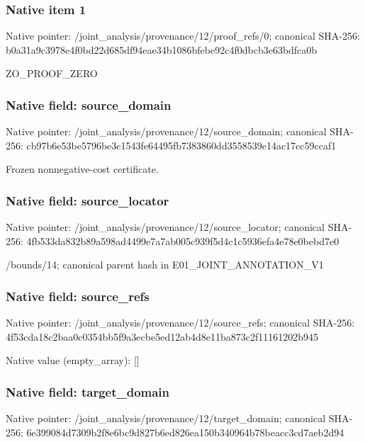 \documentclass[10pt,a4paper]{article}
\begin{document}
\subsubsection{Native item 1}
Native pointer: /joint\_\allowbreak{}analysis/provenance/12/proof\_\allowbreak{}refs/0; canonical SHA-256: b0a31a9c3978e4f0bd22d685df94eae34b1086bfebe92c4f0dbcb3e63bdfca0b

\begingroup\raggedright\sloppy ZO\_\allowbreak{}PROOF\_\allowbreak{}ZERO\par\endgroup

\subsubsection{Native field: source\_\allowbreak{}domain}
Native pointer: /joint\_\allowbreak{}analysis/provenance/12/source\_\allowbreak{}domain; canonical SHA-256: cb97b6e53be5796be3c1543fe64495fb7383860dd3558539e14ac17cc59ccaf1

\begingroup\raggedright\sloppy Frozen nonnegative-cost certificate.\par\endgroup

\subsubsection{Native field: source\_\allowbreak{}locator}
Native pointer: /joint\_\allowbreak{}analysis/provenance/12/source\_\allowbreak{}locator; canonical SHA-256: 4fb533da832b89a598ad4499e7a7ab005c939f5d4c1c5936efa4e78e0bebd7e0

\begingroup\raggedright\sloppy /\allowbreak{}bounds/\allowbreak{}14;\allowbreak{} canonical parent hash in E01\_\allowbreak{}JOINT\_\allowbreak{}ANNOTATION\_\allowbreak{}V1\par\endgroup

\subsubsection{Native field: source\_\allowbreak{}refs}
Native pointer: /joint\_\allowbreak{}analysis/provenance/12/source\_\allowbreak{}refs; canonical SHA-256: 4f53cda18c2baa0c0354bb5f9a3ecbe5ed12ab4d8e11ba873c2f11161202b945

Native value (empty\_\allowbreak{}array): []

\subsubsection{Native field: target\_\allowbreak{}domain}
Native pointer: /joint\_\allowbreak{}analysis/provenance/12/target\_\allowbreak{}domain; canonical SHA-256: 6e399084d7309b2f8e6bc9d827b6ed826ea150b340964b78beacc3cd7aeb2d94
\end{document}

